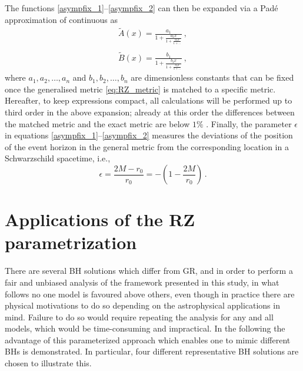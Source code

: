 \documentclass[a4paper,aps,twocolumn,showpacs,showkeys,nofootinbib,preprintnumbers,superscriptaddress,amsmath,amssymb,amsfonts]{revtex4-1}
\newcommand{\ie}{{i.e.,}~}
\begin{document}
The functions \eqref{asympfix_1}--\eqref{asympfix_2} can then be
expanded via a Pad\'e approximation of continuous as
%
\begin{subequations}
\label{contfrac}
\begin{align}
\label{contfrac_1}
{\widetilde A}(x)=\frac{a_1}{\displaystyle 1+\frac{\displaystyle
    a_2x}{\displaystyle 1+\frac{\displaystyle a_3x}{\displaystyle
      1+\ldots}}} \,,\\
%
\nonumber \\
%
\label{contfrac_2}
{\widetilde B}(x)=\frac{b_1}{\displaystyle 1+\frac{\displaystyle
    b_2x}{\displaystyle 1+\frac{\displaystyle b_3x}{\displaystyle
      1+\ldots}}}\,,
\end{align}
\end{subequations}
%
where $a_1, a_2,\ldots, a_{n}$ and $b_1, b_2,\ldots, b_{n}$ are dimensionless
constants that can be fixed once the generalised metric
\eqref{eq:RZ_metric} is matched to a specific metric. Hereafter, to keep
expressions compact, all calculations will be performed up to third order
in the above expansion; already at this order the differences between the
matched metric and the exact metric are below $1\%$
\cite{Rezzolla2014,Younsi2016,Kokkotas2017}. 
Finally, the parameter $\epsilon$ in equations \eqref{asympfix_1}--\eqref{asympfix_2} 
measures the deviations of the position of the event horizon
in the general metric from the corresponding location in a Schwarzschild
spacetime, \ie
\begin{equation}
\epsilon = \frac{2M-r_0}{r_0} = - \left(1 - \frac{2M}{r_0}\right) \,.
\label{epsilon}
\end{equation}


\section{Applications of the RZ parametrization}  
\label{tre}

There are several BH solutions which differ from GR, and in
order to perform a fair and unbiased analysis of the framework presented
in this study, in what follows no one model is favoured above others,
even though in practice there are physical motivations to do so depending
on the astrophysical applications in mind. Failure to do so would require
repeating the analysis for any and all models, which would be
time-consuming and impractical. In the following the advantage of this
parameterized approach which enables one to mimic different BHs is
demonstrated. In particular, four different representative BH solutions are
chosen to illustrate this.
\end{document}
